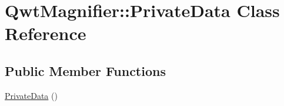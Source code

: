 \hypertarget{class_qwt_magnifier_1_1_private_data}{\section{Qwt\-Magnifier\-:\-:Private\-Data Class Reference}
\label{class_qwt_magnifier_1_1_private_data}
}
\subsection*{Public Member Functions}
\begin{DoxyCompactItemize}
\item 
\hyperlink{class_qwt_magnifier_1_1_private_data_a2751e0ccdf2125f7f962f92c47b61d77}{Private\-Data} ()
\end{DoxyCompactItemize}
